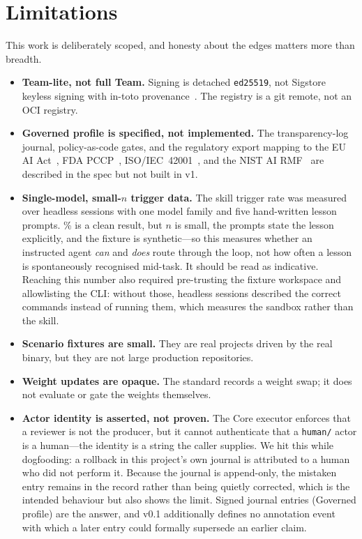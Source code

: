 \documentclass[10pt,twocolumn]{article}
\begin{document}
\section{Limitations}
\label{sec:limits}
This work is deliberately scoped, and honesty about the edges matters more
than breadth.
\begin{itemize}[leftmargin=1.2em,itemsep=1pt]
\item \textbf{Team-lite, not full Team.} Signing is detached
  \texttt{ed25519}, not Sigstore keyless signing with in-toto
  provenance~\cite{sigstore,intoto}. The registry is a git remote, not an
  OCI registry.
\item \textbf{Governed profile is specified, not implemented.} The
  transparency-log journal, policy-as-code gates, and the regulatory export
  mapping to the EU AI Act~\cite{euaiact}, FDA PCCP~\cite{fdapccp},
  ISO/IEC~42001~\cite{iso42001}, and the NIST AI RMF~\cite{nistairmf} are
  described in the spec but not built in v1.
\item \textbf{Single-model, small-$n$ trigger data.} The skill trigger rate
  was measured over \triggerN{} headless sessions with one model family and
  five hand-written lesson prompts. \triggerRate\% is a clean result, but
  $n$ is small, the prompts state the lesson explicitly, and the fixture is
  synthetic---so this measures whether an instructed agent \emph{can} and
  \emph{does} route through the loop, not how often a lesson is
  spontaneously recognised mid-task. It should be read as indicative.
  Reaching this number also required pre-trusting the fixture workspace and
  allowlisting the CLI: without those, headless sessions described the
  correct commands instead of running them, which measures the sandbox
  rather than the skill.
\item \textbf{Scenario fixtures are small.} They are real projects driven
  by the real binary, but they are not large production repositories.
\item \textbf{Weight updates are opaque.} The standard records a weight
  swap; it does not evaluate or gate the weights themselves.
\item \textbf{Actor identity is asserted, not proven.} The Core executor
  enforces that a reviewer is not the producer, but it cannot authenticate
  that a \texttt{human/} actor is a human---the identity is a string the
  caller supplies. We hit this while dogfooding: a rollback in this
  project's own journal is attributed to a human who did not perform it.
  Because the journal is append-only, the mistaken entry remains in the
  record rather than being quietly corrected, which is the intended
  behaviour but also shows the limit. Signed journal entries (Governed
  profile) are the answer, and v0.1 additionally defines no annotation
  event with which a later entry could formally supersede an earlier
  claim.
\end{itemize}
\end{document}
